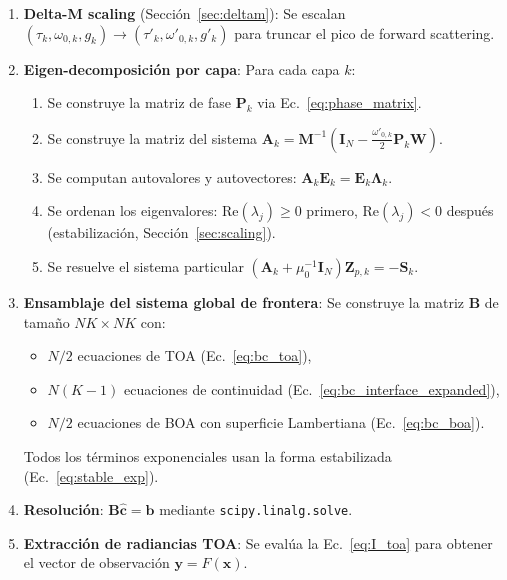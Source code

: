 \documentclass[a4paper,11pt]{article}
\begin{document}
\begin{enumerate}
    \item \textbf{Delta-M scaling} (Secci\'on~\ref{sec:deltam}):
          Se escalan $(\tau_k, \omega_{0,k}, g_k) \to (\tau'_k, \omega'_{0,k}, g'_k)$
          para truncar el pico de forward scattering.

    \item \textbf{Eigen-decomposici\'on por capa}: Para cada capa $k$:
    \begin{enumerate}
        \item Se construye la matriz de fase $\mathbf{P}_k$ via
              Ec.~\eqref{eq:phase_matrix}.
        \item Se construye la matriz del sistema
              $\mathbf{A}_k = \mathbf{M}^{-1}(\mathbf{I}_N - \frac{\omega'_{0,k}}{2}\mathbf{P}_k\mathbf{W})$.
        \item Se computan autovalores y autovectores:
              $\mathbf{A}_k\mathbf{E}_k = \mathbf{E}_k\bm{\Lambda}_k$.
        \item Se ordenan los eigenvalores: $\text{Re}(\lambda_j) \geq 0$ primero,
              $\text{Re}(\lambda_j) < 0$ despu\'es (estabilizaci\'on,
              Secci\'on~\ref{sec:scaling}).
        \item Se resuelve el sistema particular
              $(\mathbf{A}_k + \mu_0^{-1}\mathbf{I}_N)\mathbf{Z}_{p,k} = -\mathbf{S}_k$.
    \end{enumerate}

    \item \textbf{Ensamblaje del sistema global de frontera}: Se construye la
          matriz $\mathbf{B}$ de tama\~no $NK \times NK$ con:
    \begin{itemize}
        \item $N/2$ ecuaciones de TOA (Ec.~\ref{eq:bc_toa}),
        \item $N(K-1)$ ecuaciones de continuidad (Ec.~\ref{eq:bc_interface_expanded}),
        \item $N/2$ ecuaciones de BOA con superficie Lambertiana (Ec.~\ref{eq:bc_boa}).
    \end{itemize}
    Todos los t\'erminos exponenciales usan la forma estabilizada
    (Ec.~\ref{eq:stable_exp}).

    \item \textbf{Resoluci\'on}: $\mathbf{B}\hat{\mathbf{c}} = \mathbf{b}$
          mediante \texttt{scipy.linalg.solve}.

    \item \textbf{Extracci\'on de radiancias TOA}: Se eval\'ua la
          Ec.~\eqref{eq:I_toa} para obtener el vector de observaci\'on
          $\mathbf{y} = F(\mathbf{x})$.
\end{enumerate}
\end{document}
